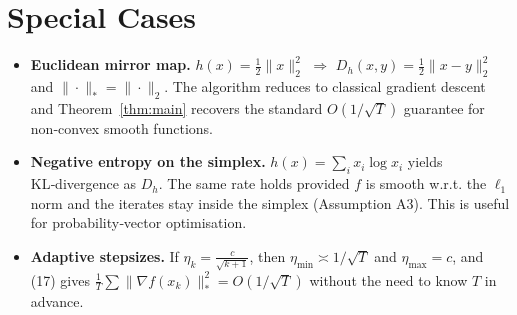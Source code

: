 \documentclass{article}
\newcommand{\gradf}{\nabla f}
\begin{document}
\section*{Special Cases}
\begin{itemize}
\item \textbf{Euclidean mirror map.} $h(x)=\tfrac12\|x\|_{2}^{2}$ $\Rightarrow$ $D_h(x,y)=\tfrac12\|x-y\|_{2}^{2}$ and $\|\cdot\|_{*}=\|\cdot\|_{2}$. The algorithm reduces to classical gradient descent and Theorem~\ref{thm:main} recovers the standard $O(1/\sqrt{T})$ guarantee for non‑convex smooth functions.
\item \textbf{Negative entropy on the simplex.} $h(x)=\sum_{i}x_i\log x_i$ yields KL‑divergence as $D_h$. The same rate holds provided $f$ is smooth w.r.t. the $\ell_{1}$ norm and the iterates stay inside the simplex (Assumption A3). This is useful for probability‑vector optimisation.
\item \textbf{Adaptive stepsizes.} If $\eta_k=\frac{c}{\sqrt{k+1}}$, then $\eta_{\min}\asymp 1/\sqrt{T}$ and $\eta_{\max}=c$, and (17) gives $\frac{1}{T}\sum\|\gradf(x_k)\|_{*}^{2}=O(1/\sqrt{T})$ without the need to know $T$ in advance.
\end{itemize}
\end{document}
